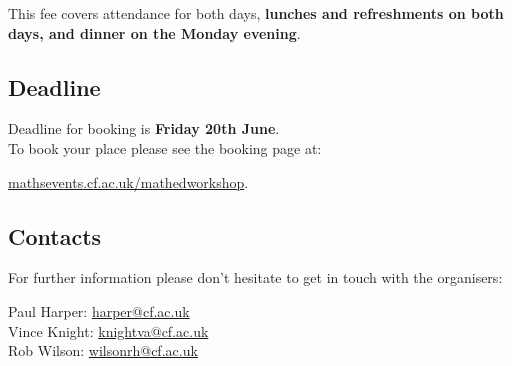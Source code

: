 \documentclass {leaflet}
\begin{document}
This fee covers attendance for both days, \textbf{lunches and refreshments on both days, and dinner on the Monday evening}.\\


\subsection{Deadline}
Deadline for booking is \textbf{Friday 20th June}.\\

To book your place please see the booking page at:
\begin{center}
\url{mathsevents.cf.ac.uk/mathedworkshop}.
\end{center}

\subsection{Contacts}
For further information please don't hesitate to get in touch with the organisers:

\begin{center}
Paul Harper: \url{harper@cf.ac.uk}\\
Vince Knight: \url{knightva@cf.ac.uk}\\
Rob Wilson: \url{wilsonrh@cf.ac.uk}
\end{center}


\loggingall
\end{document}
